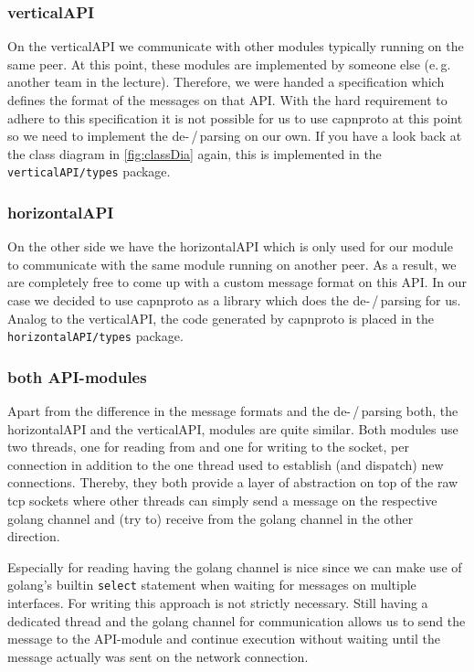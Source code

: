 \documentclass[a4paper,english,10pt,NET]{tumarticle}
\renewcommand{\eg}{\mbox{e.\,g.}\xspace} %
\begin{document}
\subsubsection{verticalAPI}
On the verticalAPI we communicate with other modules typically running on the same peer.
At this point, these modules are implemented by someone else (\eg another team in the lecture).
Therefore, we were handed a specification which defines the format of the messages on that API.
With the hard requirement to adhere to this specification it is not possible for us to use capnproto at this point so we need to implement the de-\,/\,parsing on our own.
If you have a look back at the class diagram in \cref{fig:classDia} again, this is implemented in the \texttt{verticalAPI/types} package.

\subsubsection{horizontalAPI}
On the other side we have the horizontalAPI which is only used for our module to communicate with the same module running on another peer.
As a result, we are completely free to come up with a custom message format on this API.
In our case we decided to use capnproto as a library which does the de-\,/\,parsing for us.
Analog to the verticalAPI, the code generated by capnproto is placed in the \texttt{horizontalAPI/types} package.

\subsubsection{both API-modules}
Apart from the difference in the message formats and the de-\,/\,parsing both, the horizontalAPI and the verticalAPI, modules are quite similar.
Both modules use two threads, one for reading from and one for writing to the socket, per connection in addition to the one thread used to establish (and dispatch) new connections.
Thereby, they both provide a layer of abstraction on top of the raw tcp sockets where other threads can simply send a message on the respective golang channel and (try to) receive from the golang channel in the other direction.

Especially for reading having the golang channel is nice since we can make use of golang's builtin \texttt{select} statement when waiting for messages on multiple interfaces.
For writing this approach is not strictly necessary.
Still having a dedicated thread and the golang channel for communication allows us to send the message to the API-module and continue execution without waiting until the message actually was sent on the network connection.
\end{document}
